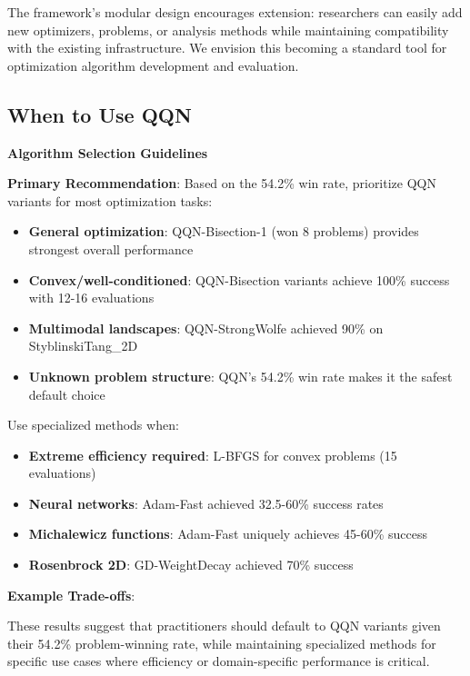 The framework's modular design encourages extension: researchers can easily add new optimizers, problems, or analysis methods while maintaining compatibility with the existing infrastructure. We envision this becoming a standard tool for optimization algorithm development and evaluation.

\hypertarget{when-to-use-qqn}{%
\subsection{When to Use QQN}\label{when-to-use-qqn}}

\textbf{Algorithm Selection Guidelines}

\textbf{Primary Recommendation}: Based on the 54.2\% win rate, prioritize QQN variants for most optimization tasks:

\begin{itemize}
\tightlist
\item
  \textbf{General optimization}: QQN-Bisection-1 (won 8 problems) provides strongest overall performance
\item
  \textbf{Convex/well-conditioned}: QQN-Bisection variants achieve 100\% success with 12-16 evaluations
\item
  \textbf{Multimodal landscapes}: QQN-StrongWolfe achieved 90\% on StyblinskiTang\_2D
\item
  \textbf{Unknown problem structure}: QQN's 54.2\% win rate makes it the safest default choice
\end{itemize}

Use specialized methods when:

\begin{itemize}
\tightlist
\item
  \textbf{Extreme efficiency required}: L-BFGS for convex problems (15 evaluations)
\item
  \textbf{Neural networks}: Adam-Fast achieved 32.5-60\% success rates
\item
  \textbf{Michalewicz functions}: Adam-Fast uniquely achieves 45-60\% success
\item
  \textbf{Rosenbrock 2D}: GD-WeightDecay achieved 70\% success
\end{itemize}

\textbf{Example Trade-offs}:

These results suggest that practitioners should default to QQN variants given their 54.2\% problem-winning rate, while maintaining specialized methods for specific use cases where efficiency or domain-specific performance is critical.

